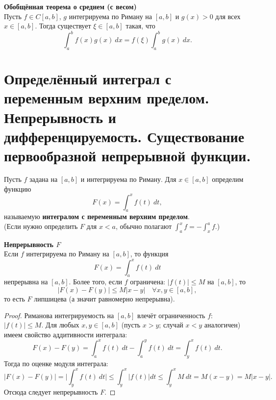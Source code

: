 \documentclass[14pt]{extreport}
\begin{document}
    \begin{theorem}
        \textbf{Обобщённая теорема о среднем (с весом)}\\
        Пусть $f \in C[a,b]$, $g$ интегрируема по Риману на $[a,b]$ и $g(x) > 0$ для всех $x \in [a,b]$. Тогда существует $\xi \in [a,b]$ такая, что
        \[
        \int_a^b f(x)g(x)\ dx = f(\xi) \int_a^b g(x)\ dx.
        \]
    \end{theorem}



    \chapter{Определённый интеграл с переменным верхним пределом. Непрерывность и дифференцируемость. Существование первообразной непрерывной функции.}

    \begin{definition}
        Пусть $f$ задана на $[a,b]$ и интегрируема по Риману. Для $x \in [a,b]$ определим функцию
        \[
        F(x) = \int_a^x f(t)\ dt,
        \]
        называемую \textbf{интегралом с переменным верхним пределом}.\\
        (Если нужно определить $F$ для $x<a$, обычно полагают $\int_a^x f = -\int_x^a f$.)
    \end{definition}

    \begin{theorem}
        \textbf{Непрерывность $F$}\\
        Если $f$ интегрируема по Риману на $[a,b]$, то функция
        \[
        F(x) = \int_a^x f(t)\ dt
        \]
        непрерывна на $[a,b]$. Более того, если $f$ ограничена: $|f(t)| \leq M$ на $[a,b]$, то
        \[
        |F(x) - F(y)| \leq M|x-y| \quad \forall x,y \in [a,b],
        \]
        то есть $F$ липшицева (а значит равномерно непрерывна).
    \end{theorem}

    \begin{proof}
        Риманова интегрируемость на $[a,b]$ влечёт ограниченность $f$: $|f(t)| \leq M$. Для любых $x,y \in [a,b]$ (пусть $x>y$; случай $x<y$ аналогичен) имеем свойство аддитивности интеграла:
        \[
        F(x) - F(y) = \int_a^x f(t)\ dt - \int_a^y f(t)\ dt = \int_y^x f(t)\ dt.
        \]
        Тогда по оценке модуля интеграла:
        \[
        |F(x) - F(y)| = \Bigg| \int_y^x f(t)\ dt \Bigg| \leq \int_y^x |f(t)|dt \leq \int_y^x M\ dt = M(x-y) = M|x-y|.
        \]
        Отсюда следует непрерывность $F$.
    \end{proof}
\end{document}
